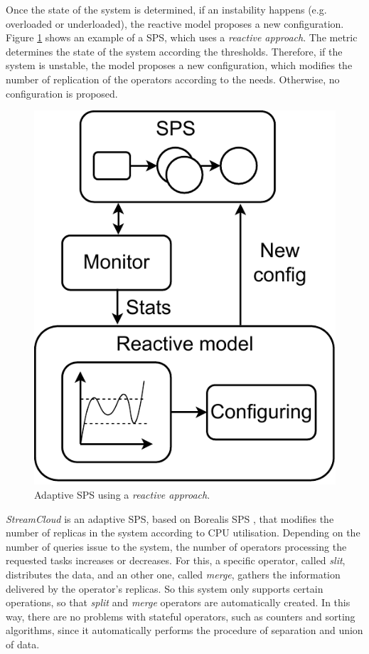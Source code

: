 Once the state of the system is determined, if an instability happens (e.g. overloaded or underloaded), the reactive model proposes a new configuration. Figure \ref{fig:rw-reactive} shows an example of a SPS, which uses a \textit{reactive approach}. The metric determines the state of the system according the thresholds. Therefore, if the system is unstable, the model proposes a new configuration, which modifies the number of replication of the operators according to the needs. Otherwise, no configuration is proposed.

\begin{figure}
	\centering
	\includegraphics[scale=0.85]{figures/concepts/RW-Reactive.pdf}
	\caption{Adaptive SPS using a \textit{reactive approach}.}
	\label{fig:rw-reactive}
\end{figure}

\textit{StreamCloud} \citep{GulisanoJPSV12} is an adaptive SPS, based on Borealis SPS \citep{AbadiABCCHLMRRTXZ05}, that modifies the number of replicas in the system according to CPU utilisation. Depending on the number of queries issue to the system, the number of operators processing the requested tasks increases or decreases. For this, a specific operator, called \textit{slit}, distributes the data, and an other one, called \textit{merge}, gathers the information delivered by the operator’s replicas. So this system only supports certain operations, so that \textit{split} and \textit{merge} operators are automatically created. In this way, there are no problems with stateful operators, such as counters and sorting algorithms, since it automatically performs the procedure of separation and union of data.

